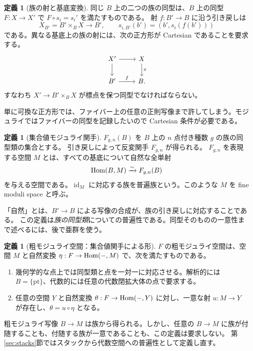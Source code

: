 \documentclass[dvipdfmx,a4paper,11pt]{article}
\theoremstyle{definition}
\newtheorem{dfn}[thm]{定義}
\newcommand{\id}{\operatorname{id}}
\begin{document}
\begin{dfn}[族の射と基底変換]
同じ $B$ 上の二つの族の同型は、$B$ 上の同型 $F:X\to X'$ で $F\circ s_i=s_i'$ を満たすものである。
射 $f:B'\to B$ に沿う引き戻しは
\[
X_{B'}=B'\times_B X\longrightarrow B',\qquad
s_{i,B'}(b')=(b',s_i(f(b')))
\]
である。異なる基底上の族の射には、次の正方形が Cartesian であることを要求する。
\[
\begin{tikzcd}
X'\ar[r]\ar[d]&X\ar[d,"\pi"]\\
B'\ar[r,"f"]&B.
\end{tikzcd}
\]
すなわち $X'\to B'\times_BX$ が標点を保つ同型でなければならない。
\end{dfn}
単に可換な正方形では、ファイバー上の任意の正則写像まで許してしまう。モジュライではファイバーの同型を記録したいので Cartesian 条件が必要である。

\begin{dfn}[集合値モジュライ関手]
$F_{g,n}(B)$ を $B$ 上の $n$ 点付き種数 $g$ の族の同型類の集合とする。
引き戻しによって反変関手 $F_{g,n}$ が得られる。
$F_{g,n}$ を表現する空間 $M$ とは、すべての基底について自然な全単射
\[
\operatorname{Hom}(B,M)\xrightarrow{\sim}F_{g,n}(B)
\]
を与える空間である。$\id_M$ に対応する族を普遍族という。このような $M$ を fine moduli space と呼ぶ。
\end{dfn}
「自然」とは、$B'\to B$ による写像の合成が、族の引き戻しに対応することである。
この定義は\emph{族の同型類}についての普遍性である。同型そのものの一意性まで述べるには、後で亜群を使う。

\begin{dfn}[粗モジュライ空間：集合値関手による形]\label{def:coarsefunctor}
$F$ の粗モジュライ空間は、空間 $M$ と自然変換 $\eta:F\to\operatorname{Hom}(-,M)$ で、次を満たすものである。
\begin{enumerate}
\item 幾何学的な点上では同型類と点を一対一に対応させる。解析的には $B=\{\mathrm{pt}\}$、代数的には任意の代数閉拡大体の点で要求する。
\item 任意の空間 $Y$ と自然変換 $\theta:F\to\operatorname{Hom}(-,Y)$ に対し、一意な射 $u:M\to Y$ が存在し、$\theta=u\circ\eta$ となる。
\end{enumerate}
\end{dfn}
粗モジュライ写像 $B\to M$ は族から得られる。しかし、任意の $B\to M$ に族が付随することも、付随する族が一意であることも、この定義は要求しない。
第\ref{sec:stacks}節ではスタックから代数空間への普遍性として定義し直す。
\end{document}

